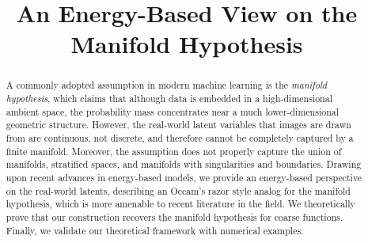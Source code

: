 \documentclass{article}
\title{An Energy-Based View on the Manifold Hypothesis}
\author{}
\begin{document}
\maketitle



\begin{abstract}
	A commonly adopted assumption in modern machine learning is the \emph{manifold hypothesis}, which claims that although data is embedded in a high-dimensional ambient space, the probability mass concentrates near a much lower-dimensional geometric structure. However, the real-world latent variables that images are drawn from are continuous, not discrete, and therefore cannot be completely captured by a finite manifold. Moreover, the assumption does not properly capture the union of manifolds, stratified spaces, and manifolds with singularities and boundaries. Drawing upon recent advances in energy-based models, we provide an energy-based perspective on the real-world latents, describing an Occam's razor style analog for the manifold hypothesis, which is more amenable to recent literature in the field. We theoretically prove that our construction recovers the manifold hypothesis for coarse functions. Finally, we validate our theoretical framework with numerical examples.
\end{abstract}



\end{document}
